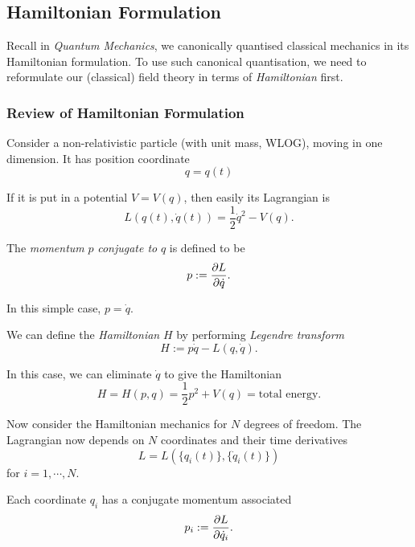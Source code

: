 \documentclass[a4paper,11pt]{article}
\begin{document}
	\subsection{Hamiltonian Formulation}
	
	Recall in \emph{Quantum Mechanics}, we canonically quantised classical mechanics in its Hamiltonian formulation. To use such canonical quantisation, we need to reformulate our (classical) field theory in terms of \emph{Hamiltonian} first.

	\subsubsection{Review of Hamiltonian Formulation}

	Consider a non-relativistic particle (with unit mass, WLOG), moving in one dimension. It has position coordinate
	\[
		q = q(t)
	\]
	
	If it is put in a potential $V = V(q)$, then easily its Lagrangian is
	\[
		L (q(t), \dot{q}(t)) = \frac{1}{2} \dot{q}^2 - V(q).
	\]
	
	\begin{defi}
		The \emph{momentum} $p$ \emph{conjugate to} $q$ is defined to be 
		\begin{equation}
			p := \pdv{L}{\dot{q}}.
			\label{eq:2.1.1}
		\end{equation}
	\end{defi}

	In this simple case, $p = \dot q$.
	
	\begin{defi}
		We can define the \emph{Hamiltonian} $H$ by performing \emph{Legendre transform}
		\begin{equation}
			H := p \dot q - L(q,\dot q).
			\label{eq:2.1.2}
		\end{equation}
	\end{defi}

	In this case, we can eliminate $\dot q$ to give the Hamiltonian
	\[
		H = H(p,q) = \frac{1}{2} p^2 + V(q) = \text{total energy}.
	\]
	
	Now consider the Hamiltonian mechanics for $N$ degrees of freedom. The Lagrangian now depends on $N$ coordinates and their time derivatives
	\[
		L = L \left( \{q_i(t)\}, \{\dot{q}_i(t)\} \right)
	\]
	for $i = 1,\cdots, N$.

	Each coordinate $q_i$ has a conjugate momentum associated
	\begin{equation}
		p_i := \pdv{L}{\dot{q}_i}.
		\label{eq:2.1.3}
	\end{equation}
	
\end{document}
